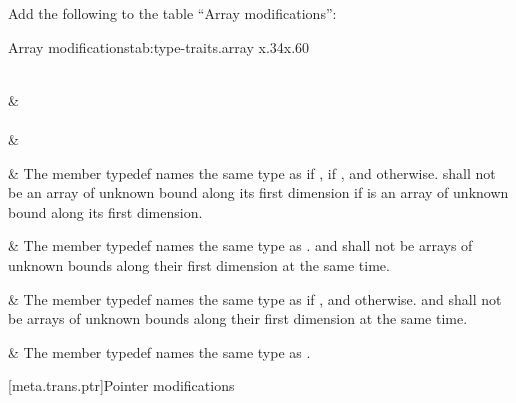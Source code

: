 \documentclass[ebook,10pt,oneside,openany,final]{memoir}
\newenvironment{libreqtab2b}[2]
{
 \begin{LongTable}
 {#1}{#2}
 {x{.34\hsize}x{.60\hsize}}
}
{
 \end{LongTable}
}
\begin{document}
\pnum
Add the following to the table ``Array modifications'':

\begin{libreqtab2b}{Array modifications}{tab:type-traits.array}
\\ \topline
{} &    \\ \capsep
\endfirsthead
\continuedcaption\\
\topline
{} &    \\ \capsep
\endhead

%
 &
The member typedef  names the same type as  if ,  if , and  otherwise.\br
\requires{}  shall not be an array of unknown bound along its first dimension if  is an array of unknown bound along its first dimension.
\\ \rowsep

%
 &
The member typedef  names the same type as .\br
\requires{}  and  shall not be arrays of unknown bounds along their first dimension at the same time.
\\ \rowsep
    
%
 &
The member typedef  names the same type as  if , and  otherwise.\br
\requires{}  and  shall not be arrays of unknown bounds along their first dimension at the same time.
\\ \rowsep

%
 &
The member typedef  names the same type as .
\\
\end{libreqtab2b}
[meta.trans.ptr]{Pointer modifications}
\end{document}

